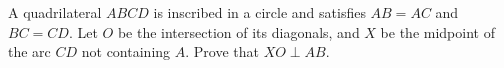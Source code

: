 \problem
A quadrilateral $ABCD$ is inscribed in a circle and satisfies $AB = AC$ and
$BC = CD$.
Let $O$ be the intersection of its diagonals, and $X$ be the midpoint of the
arc $CD$ not containing $A$.
Prove that $XO \perp AB$.
\solution
\endproblem
